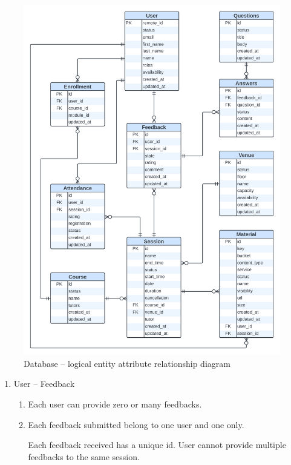 \begin{justify}
    \begin{figure}[H]
    \centerline{\includegraphics[width=145mm,scale=1]{figures/analysis_and_design/design/1. Logical Enitiy Attribute Relationship Diagram V2.png}}
    \caption{Database -- logical entity attribute relationship diagram}
    \label{logicalEARD}
    \end{figure}
\vspace{-0.5cm}
\begin{enumerate}
    \item User -- Feedback
        \begin{enumerate}[itemsep=-0.3cm]
            \item Each user can provide zero or many feedbacks.
            \item Each feedback submitted belong to one user and one only.

            \newendline Each feedback received has a unique id. User cannot provide multiple feedbacks to the same session.
        \end{enumerate}
    


\end{enumerate}
\end{justify}
